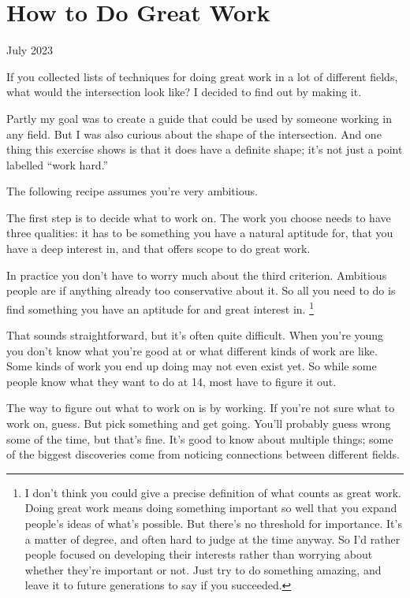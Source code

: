 \chapter{How to Do Great Work}

July 2023

If you collected lists of techniques for doing great work in a lot of
different fields, what would the intersection look like? I decided to
find out by making it.

Partly my goal was to create a guide that could be used by someone
working in any field. But I was also curious about the shape of the
intersection. And one thing this exercise shows is that it does have a
definite shape; it's not just a point labelled ``work hard.''

The following recipe assumes you're very ambitious.

The first step is to decide what to work on. The work you choose needs
to have three qualities: it has to be something you have a natural
aptitude for, that you have a deep interest in, and that offers scope to
do great work.

In practice you don't have to worry much about the third criterion.
Ambitious people are if anything already too conservative about it. So
all you need to do is find something you have an aptitude for and great
interest in. \footnote{I don't think you could give a precise definition of what counts
as great work. Doing great work means doing something important so well
that you expand people's ideas of what's possible. But there's no
threshold for importance. It's a matter of degree, and often hard to
judge at the time anyway. So I'd rather people focused on developing
their interests rather than worrying about whether they're important or
not. Just try to do something amazing, and leave it to future
generations to say if you succeeded.}

That sounds straightforward, but it's often quite difficult. When you're
young you don't know what you're good at or what different kinds of work
are like. Some kinds of work you end up doing may not even exist yet. So
while some people know what they want to do at 14, most have to figure
it out.

The way to figure out what to work on is by working. If you're not sure
what to work on, guess. But pick something and get going. You'll
probably guess wrong some of the time, but that's fine. It's good to
know about multiple things; some of the biggest discoveries come from
noticing connections between different fields.

